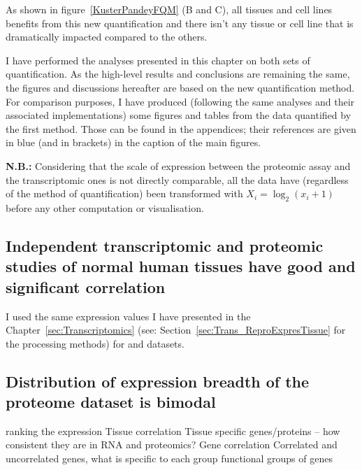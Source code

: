 As shown in figure~\ref{KusterPandeyFQM} (B and C),
all tissues and cell lines benefits from this new quantification and there isn't
any tissue or cell line that is dramatically impacted compared to the others.


I have performed the analyses presented in this chapter on both sets of
quantification. As the high-level results and conclusions are remaining the same,
the figures and discussions hereafter are based on
the new quantification method. For comparison purposes,
I have produced (following the same analyses and their associated implementations)
some figures and tables from the data quantified by the first method.
Those can be found in the appendices; their references
are given in blue (and in brackets) in the caption of the main figures.


\textbf{N.B.:} Considering that the scale of expression between
the proteomic assay and the transcriptomic ones is not directly comparable,
all the data have (regardless of the method of quantification) been transformed
with $X_{i}=\log_{2} (x_{i}+1)$ before any other computation or visualisation.

\subsection{Independent transcriptomic and proteomic studies of normal
human tissues have good and significant correlation}
\label{subsec:IntegrationGoodCorrProtTrans}

I used the same expression values I have presented in the
Chapter~\ref{sec:Transcriptomics} (see: Section~\ref{sec:Trans_ReproExpresTissue}
for the processing methods) for  and  datasets.





\subsection{Distribution of expression breadth of the proteome dataset is bimodal}
\label{subsec:IntegrationProteinBimodalExpre}


 ranking the expression
Tissue correlation
Tissue specific genes/proteins – how consistent they are in RNA and proteomics?
Gene correlation
Correlated and uncorrelated genes, what is specific to each group
functional groups of genes


